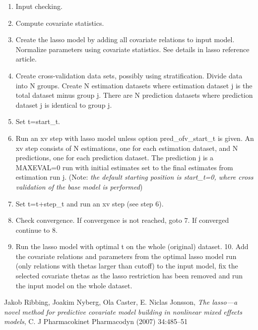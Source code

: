 \documentclass[a4paper,12pt]{article}
\begin{document}
\begin{enumerate}
\item Input checking.
\item Compute covariate statistics.
\item Create the lasso model by adding all covariate relations to input model. Normalize parameters using covariate statistics. See details in lasso reference article.
\item Create cross-validation data sets, possibly using stratification. Divide data into N groups. Create N estimation datasets where estimation dataset j is the total dataset minus group j. There are N prediction datasets where prediction dataset j is identical to group j. 
\item Set t=start\_t. 
\item Run an xv step with lasso model unless option pred\_ofv\_start\_t is given. An xv step consists of N estimations, one for each estimation dataset, and N predictions, one for each prediction dataset. The prediction j is a MAXEVAL=0 run with initial estimates set to the final estimates from estimation run j. (Note: \emph{the default starting position is start\_t=0, where cross validation of the base model is performed})
\item Set t=t+step\_t and run an xv step (see step 6).
\item Check convergence. If convergence is not reached, goto 7. If converged continue to 8.
\item Run the lasso model with optimal t on the whole (original) dataset. 
10. Add the covariate relations and parameters from the optimal lasso model run (only relations with thetas larger than cutoff) to the input model, fix the selected covariate thetas as the lasso restriction has been removed and run the input model on the whole dataset.
\end{enumerate}


\begin{thebibliography}{1}
 Jakob Ribbing, Joakim Nyberg, Ola Caster, E. Niclas Jonsson, {\em The lasso—a novel method for predictive covariate model building in nonlinear mixed effects models}, C. J Pharmacokinet Pharmacodyn (2007) 34:485–51
\end{thebibliography}
\end{document}
